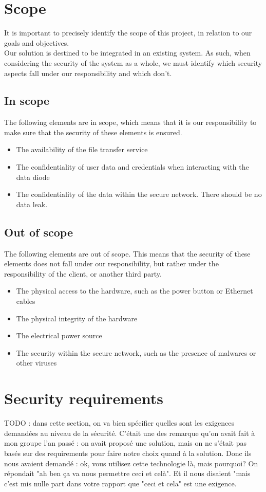 \documentclass[a4paper,11pt]{article}
\begin{document}
\section{Scope}
It is important to precisely identify the scope of this project, in relation to our goals and objectives.\\

Our solution is destined to be integrated in an existing system. As such, when considering the security of the system as a whole, we must identify which security aspects fall under our responsibility and which don't. 

\subsection{In scope}
The following elements are in scope, which means that it is our responsibility to make sure that the security of these elements is ensured.

\begin{itemize}
\item{The availability of the file transfer service}
\item{The confidentiality of user data and credentials when interacting with the data diode}
\item{The confidentiality of the data within the secure network. There should be no data leak.}
\end{itemize}

\subsection{Out of scope}
The following elements are out of scope. This means that the security of these elements does not fall under our responsibility, but rather under the responsibility of the client, or another third party.

\begin{itemize}
\item{The physical access to the hardware, such as the power button or Ethernet cables}
\item{The physical integrity of the hardware}
\item{The electrical power source}
\item{The security within the secure network, such as the presence of malwares or other viruses}
\end{itemize}

\section{Security requirements}
TODO : dans cette section, on va bien spécifier quelles sont les exigences demandées au niveau de la sécurité. C'était une des remarque qu'on avait fait à mon groupe l'an passé : on avait proposé une solution, mais on ne s'était pas basés sur des requirements pour faire notre choix quand à la solution. Donc ils nous avaient demandé : ok, vous utilisez cette technologie là, mais pourquoi? On répondait "ah ben ça va nous permettre ceci et celà". Et il nous disaient "mais c'est mis nulle part dans votre rapport que "ceci et cela" est une exigence.\\
\end{document}
